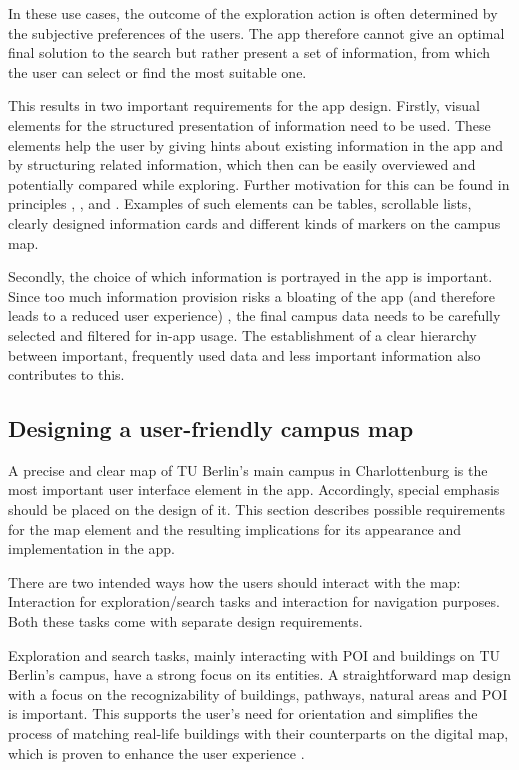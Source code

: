 In these use cases, the outcome of the exploration action is often determined by the subjective preferences of the users. The app therefore cannot give an optimal final solution to the search but rather present a set of information, from which the user can select or find the most suitable one.

This results in two important requirements for the app design. Firstly, visual elements for the structured presentation of information need to be used. These elements help the user by giving hints about existing information in the app and by structuring related information, which then can be easily overviewed and potentially compared while exploring. Further motivation for this can be found in principles \cite{jakobs_law}, \cite{law_of_common_region}, \cite{hicks_law} and \cite{millers_law}. Examples of such elements can be tables, scrollable lists, clearly designed information cards and different kinds of markers on the campus map.

Secondly, the choice of which information is portrayed in the app is important. Since too much information provision risks a bloating of the app (and therefore leads to a reduced user experience) \cite{hicks_law}, the final campus data needs to be carefully selected and filtered for in-app usage. The establishment of a clear hierarchy between important, frequently used data and less important information also contributes to this.

\subsection{Designing a user-friendly campus map}
A precise and clear map of TU Berlin's main campus in Charlottenburg is the most important user interface element in the app. Accordingly, special emphasis should be placed on the design of it. This section describes possible requirements for the map element and the resulting implications for its appearance and implementation in the app.

There are two intended ways how the users should interact with the map: Interaction for exploration/search tasks and interaction for navigation purposes. Both these tasks come with separate design requirements.

Exploration and search tasks, mainly interacting with POI and buildings on TU Berlin's campus, have a strong focus on its entities. A straightforward map design with a focus on the recognizability of buildings, pathways, natural areas and POI is important. This supports the user's need for orientation and simplifies the process of matching real-life buildings with their counterparts on the digital map, which is proven to enhance the user experience \cite{jakobs_law}.

